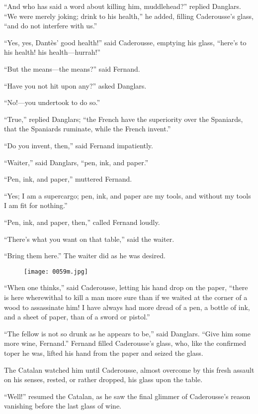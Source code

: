 “And who has said a word about killing him, muddlehead?” replied
Danglars. “We were merely joking; drink to his health,” he added,
filling Caderousse’s glass, “and do not interfere with us.”

“Yes, yes, Dantès’ good health!” said Caderousse, emptying his glass,
“here’s to his health! his health—hurrah!”

“But the means—the means?” said Fernand.

“Have you not hit upon any?” asked Danglars.

“No!—you undertook to do so.”

“True,” replied Danglars; “the French have the superiority over the
Spaniards, that the Spaniards ruminate, while the French invent.”

“Do you invent, then,” said Fernand impatiently.

“Waiter,” said Danglars, “pen, ink, and paper.”

“Pen, ink, and paper,” muttered Fernand.

“Yes; I am a supercargo; pen, ink, and paper are my tools, and without
my tools I am fit for nothing.”

“Pen, ink, and paper, then,” called Fernand loudly.

“There’s what you want on that table,” said the waiter.

“Bring them here.” The waiter did as he was desired.

\begin{figure}[h]
\texttt{[image: 0059m.jpg]}
\end{figure}

“When one thinks,” said Caderousse, letting his hand drop on the paper,
“there is here wherewithal to kill a man more sure than if we waited at
the corner of a wood to assassinate him! I have always had more dread
of a pen, a bottle of ink, and a sheet of paper, than of a sword or
pistol.”

“The fellow is not so drunk as he appears to be,” said Danglars. “Give
him some more wine, Fernand.” Fernand filled Caderousse’s glass, who,
like the confirmed toper he was, lifted his hand from the paper and
seized the glass.

The Catalan watched him until Caderousse, almost overcome by this fresh
assault on his senses, rested, or rather dropped, his glass upon the
table.

“Well!” resumed the Catalan, as he saw the final glimmer of
Caderousse’s reason vanishing before the last glass of wine.

